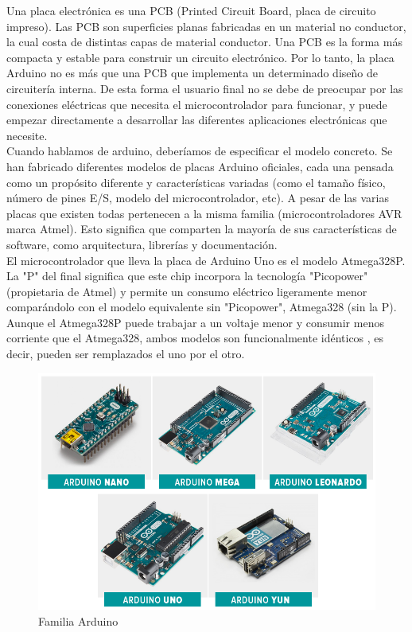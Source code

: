 \documentclass[12pt,titlepage]{article}
\begin{document}
Una placa electrónica es una PCB (Printed Circuit Board, placa de circuito impreso). Las PCB son superficies planas fabricadas en un material no conductor, la cual costa de distintas capas de material conductor. Una PCB es la forma más compacta y estable para construir un circuito electrónico. Por lo tanto, la placa Arduino no es más que una PCB que implementa un determinado diseño de circuitería interna. De esta forma el usuario final no se debe de preocupar por las conexiones eléctricas que necesita el microcontrolador para funcionar, y puede empezar directamente a desarrollar las diferentes aplicaciones electrónicas que necesite. \\[0.8mm]

Cuando hablamos de arduino, deberíamos de especificar el modelo concreto. Se han fabricado diferentes modelos de placas Arduino oficiales, cada una pensada como un propósito diferente y características variadas (como el tamaño físico, número de pines E/S, modelo del microcontrolador, etc). A pesar de las varias placas que existen todas pertenecen a la misma familia (microcontroladores AVR marca Atmel). Esto significa que comparten la mayoría de sus características de software, como arquitectura, librerías y documentación. \\[0.8mm] 

El microcontrolador que lleva la placa de Arduino Uno es el modelo Atmega328P. La "P" del final significa que este chip incorpora la tecnología "Picopower"(propietaria de Atmel) y permite un consumo eléctrico ligeramente menor comparándolo con el modelo equivalente sin "Picopower", Atmega328 (sin la P). Aunque el Atmega328P puede trabajar a un voltaje menor y consumir menos corriente que el Atmega328, ambos modelos son funcionalmente idénticos , es decir, pueden ser remplazados el uno por el otro. \\[0.8mm]

\begin{figure}[htbp]
\hspace*{4.0cm} 
\includegraphics[scale=0.35]{arduino-familia}
\caption{Familia Arduino}
\end{figure}
\newpage
\end{document}
